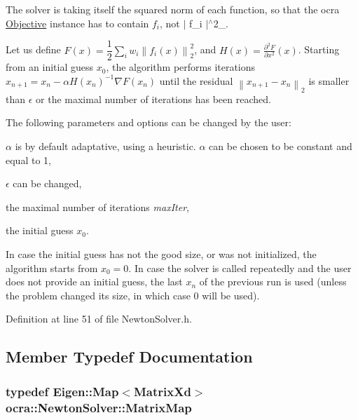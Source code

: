 The solver is taking itself the squared norm of each function, so that the ocra \hyperlink{classocra_1_1Objective}{Objective} instance has to contain $ f_i $, not $|$ f\+\_\+i $|$$^\wedge$2\+\_.

Let us define $ F(x) = \dfrac{1}{2} \sum_i{ w_i \left\| f_i(x) \right\|^2_2} $, and $ H(x)=\frac{\partial^2 F}{\partial x^2}(x)$. Starting from an initial guess $ x_0 $, the algorithm performs iterations $ x_{n+1} = x_n - \alpha H(x_n)^{-1} \nabla F(x_n) $ until the residual $ \left\|x_{n+1} - x_n\right\|_2$ is smaller than $ \epsilon $ or the maximal number of iterations has been reached.

The following parameters and options can be changed by the user\+:
\begin{DoxyItemize}
\item $ \alpha $ is by default adaptative, using a heuristic. $ \alpha $ can be chosen to be constant and equal to 1,
\item $ \epsilon $ can be changed,
\item the maximal number of iterations {\itshape max\+Iter},
\item the initial guess $ x_0 $.
\end{DoxyItemize}

In case the initial guess has not the good size, or was not initialized, the algorithm starts from $ x_0=0 $. In case the solver is called repeatedly and the user does not provide an initial guess, the last $ x_n $ of the previous run is used (unless the problem changed its size, in which case 0 will be used). 

Definition at line 51 of file Newton\+Solver.\+h.



\subsection{Member Typedef Documentation}
\subsubsection[{\texorpdfstring{Matrix\+Map}{MatrixMap}}]{\setlength{\rightskip}{0pt plus 5cm}typedef Eigen\+::\+Map$<$Matrix\+Xd$>$ {\bf ocra\+::\+Newton\+Solver\+::\+Matrix\+Map}}\hypertarget{classocra_1_1NewtonSolver_a53e3463c336170efa3819d725c9b16e3}{}\label{classocra_1_1NewtonSolver_a53e3463c336170efa3819d725c9b16e3}


